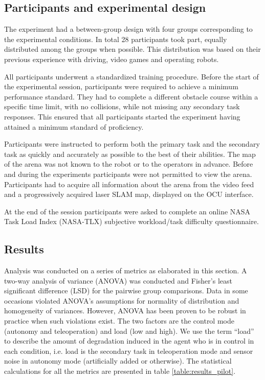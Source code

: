 \documentclass[a4paper,12pt,oneside,openright]{bhamthesis}
\begin{document}
\subsection{Participants and experimental design}

The experiment had a between-group design with four groups corresponding to the experimental conditions. In total 28 participants took part, equally distributed among the groups when possible. This distribution was based on their previous experience with driving, video games and operating robots. 

All participants underwent a standardized training procedure. Before the start of the experimental session, participants were required to achieve a minimum performance standard. They had to complete a different obstacle course within a specific time limit, with no collisions, while not missing any secondary task responses. This ensured that all participants started the experiment having attained a minimum standard of proficiency.

Participants were instructed to perform both the primary task and the secondary task as quickly and accurately as possible to the best of their abilities. The map of the arena was not known to the robot or to the operators in advance. Before and during the experiments participants were not permitted to view the arena. Participants had to acquire all information about the arena from the video feed and a progressively acquired laser SLAM map, displayed on the OCU interface.

At the end of the session participants were asked to complete an online NASA Task Load Index (NASA-TLX) \citep{Sharek2011} subjective workload/task difficulty questionnaire.

\subsection{Results}

Analysis was conducted on a series of metrics as elaborated in this section. A two-way analysis of variance (ANOVA) was conducted and Fisher's least significant difference (LSD) for the pairwise group comparisons. Data in some occasions violated ANOVA's assumptions for normality of distribution and homogeneity of variances. However, ANOVA has been proven to be robust in practice when such violations exist. The two factors are the control mode (autonomy and teleoperation) and load (low and high). We use the term ``load'' to describe the amount of degradation induced in the agent who is in control in each condition, i.e. load is the secondary task in teleoperation mode and sensor noise in autonomy mode (artificially added or otherwise). The statistical calculations for all the metrics are presented in table \ref{table:results_pilot}.
\end{document}
